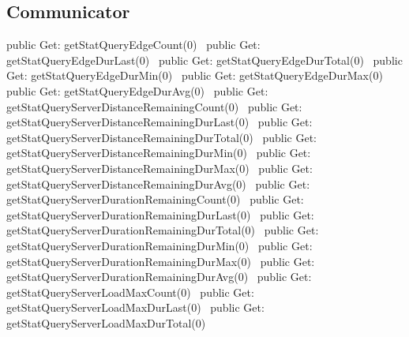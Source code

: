 \subsection{Communicator}
\nwenddocs{}\plusendmoddef
public \LA{}Get: getStatQueryEdgeCount(0)~{\nwtagstyle{}}\RA{}
public \LA{}Get: getStatQueryEdgeDurLast(0)~{\nwtagstyle{}}\RA{}
public \LA{}Get: getStatQueryEdgeDurTotal(0)~{\nwtagstyle{}}\RA{}
public \LA{}Get: getStatQueryEdgeDurMin(0)~{\nwtagstyle{}}\RA{}
public \LA{}Get: getStatQueryEdgeDurMax(0)~{\nwtagstyle{}}\RA{}
public \LA{}Get: getStatQueryEdgeDurAvg(0)~{\nwtagstyle{}}\RA{}
public \LA{}Get: getStatQueryServerDistanceRemainingCount(0)~{\nwtagstyle{}}\RA{}
public \LA{}Get: getStatQueryServerDistanceRemainingDurLast(0)~{\nwtagstyle{}}\RA{}
public \LA{}Get: getStatQueryServerDistanceRemainingDurTotal(0)~{\nwtagstyle{}}\RA{}
public \LA{}Get: getStatQueryServerDistanceRemainingDurMin(0)~{\nwtagstyle{}}\RA{}
public \LA{}Get: getStatQueryServerDistanceRemainingDurMax(0)~{\nwtagstyle{}}\RA{}
public \LA{}Get: getStatQueryServerDistanceRemainingDurAvg(0)~{\nwtagstyle{}}\RA{}
public \LA{}Get: getStatQueryServerDurationRemainingCount(0)~{\nwtagstyle{}}\RA{}
public \LA{}Get: getStatQueryServerDurationRemainingDurLast(0)~{\nwtagstyle{}}\RA{}
public \LA{}Get: getStatQueryServerDurationRemainingDurTotal(0)~{\nwtagstyle{}}\RA{}
public \LA{}Get: getStatQueryServerDurationRemainingDurMin(0)~{\nwtagstyle{}}\RA{}
public \LA{}Get: getStatQueryServerDurationRemainingDurMax(0)~{\nwtagstyle{}}\RA{}
public \LA{}Get: getStatQueryServerDurationRemainingDurAvg(0)~{\nwtagstyle{}}\RA{}
public \LA{}Get: getStatQueryServerLoadMaxCount(0)~{\nwtagstyle{}}\RA{}
public \LA{}Get: getStatQueryServerLoadMaxDurLast(0)~{\nwtagstyle{}}\RA{}
public \LA{}Get: getStatQueryServerLoadMaxDurTotal(0)~{\nwtagstyle{}}\RA{}
